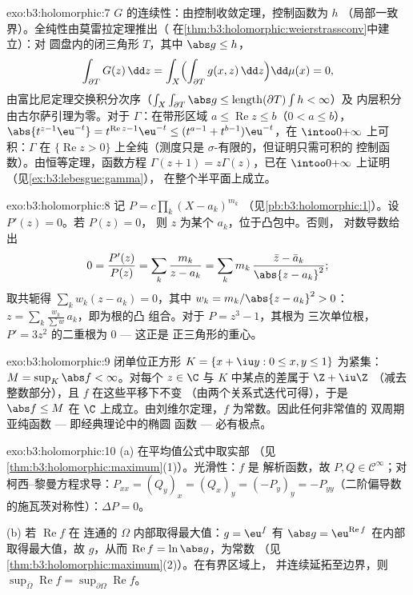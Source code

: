 \begin{solution}{exo:b3:holomorphic:7}
$G$ 的连续性：由控制收敛定理，控制函数为 $h$
（局部一致界）。全纯性由莫雷拉定理推出（
在\cref{thm:b3:holomorphic:weierstrassconv}中建立）：对
圆盘内的闭三角形 $T$，其中 $\abs g \leq h$，
\[
\int_{\partial T}G(z)\,\dd z =
\int_X\Bigl(\int_{\partial T}g(x, z)\,\dd z\Bigr)\dd\mu(x) =
0,
\]
由富比尼定理交换积分次序（$\int_X\int_{\partial T}\abs
g \leq \operatorname{length}(\partial T)\int h < \infty$）及
内层积分由古尔萨引理为零。对于 $\Gamma$：在带形区域 $a
\leq \operatorname{Re}z \leq b$（$0 < a \leq b$），
$\abs{t^{z-1}\eu^{-t}} = t^{\operatorname{Re}z-1}\eu^{-t} \leq
(t^{a-1} + t^{b-1})\eu^{-t}$，在
$\intoo0{+\infty}$ 上可积：$\Gamma$ 在
$\{\operatorname{Re} z > 0\}$ 上全纯（测度只是
$\sigma$-有限的，但证明只需可积的
控制函数）。由恒等定理，函数方程
$\Gamma(z + 1) = z\Gamma(z)$，已在
$\intoo0{+\infty}$ 上证明（见\cref{ex:b3:lebesgue:gamma}），
在整个半平面上成立。
\end{solution}

\begin{solution}{exo:b3:holomorphic:8}
记 $P = c\prod_k(X - a_k)^{m_k}$
（见\cref{pb:b3:holomorphic:1}）。设 $P'(z) = 0$。若 $P(z) = 0$，
则 $z$ 为某个 $a_k$，位于凸包中。否则，
对数导数给出
\[
0 = \frac{P'(z)}{P(z)} = \sum_k\frac{m_k}{z - a_k}
= \sum_k m_k\,\frac{\bar z - \bar a_k}{\abs{z - a_k}^2} ;
\]
取共轭得 $\sum_kw_k(z - a_k) = 0$，其中 $w_k = m_k/\abs{z -
a_k}^2 > 0$：$z = \sum_k\frac{w_k}{\sum w}\,a_k$，即为根的凸
组合。对于 $P = z^3 - 1$，其根为
三次单位根，$P' = 3z^2$ 的二重根为 $0$ --- 这正是
正三角形的重心。
\end{solution}

\begin{solution}{exo:b3:holomorphic:9}
闭单位正方形 $K = \{x + \iu y : 0 \leq x, y \leq
1\}$ 为紧集：$M = \sup_K\abs f < \infty$。对每个 $z \in \C$
与 $K$ 中某点的差属于 $\Z + \iu\Z$
（减去整数部分），且 $f$ 在这些平移下不变
（由两个关系式迭代可得），于是 $\abs f \leq M$ 在
$\C$ 上成立。由刘维尔定理，$f$ 为常数。因此任何非常值的
双周期亚纯函数 --- 即经典理论中的椭圆
函数 --- 必有极点。
\end{solution}

\begin{solution}{exo:b3:holomorphic:10}
(a) 在平均值公式中取实部
（见\cref{thm:b3:holomorphic:maximum}(1)）。光滑性：$f$ 是
解析函数，故 $P, Q \in \mathcal C^\infty$；对
柯西–黎曼方程求导：$P_{xx} = (Q_y)_x = (Q_x)_y = (-P_y)_y =
-P_{yy}$（二阶偏导数的施瓦茨对称性）：$\Delta P =
0$。

(b) 若 $\operatorname{Re}f$ 在
连通的 $\Omega$ 内部取得最大值：$g = \eu^f$ 有 $\abs g =
\eu^{\operatorname{Re}f}$ 在内部取得最大值，故
$g$，从而 $\operatorname{Re}f = \ln\abs g$，为常数
（见\cref{thm:b3:holomorphic:maximum}(2)）。在有界区域上，
并连续延拓至边界，则
$\sup_{\bar\Omega}\operatorname{Re}f =
\sup_{\partial\Omega}\operatorname{Re}f$。
\end{solution}

